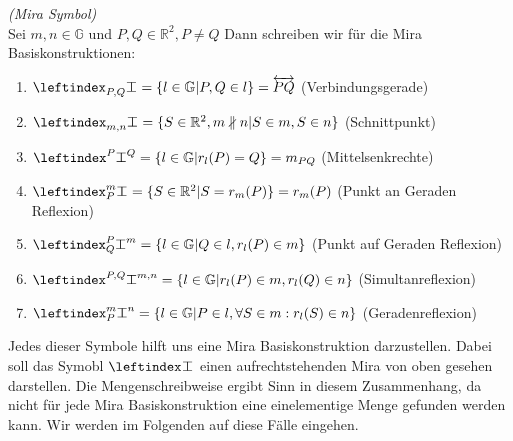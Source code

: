 \begin{notation}
    \textit{(Mira Symbol)}\\
    \label{not:mira}
    Sei $m,n \in \mathbb{G}$ und $P,Q \in \mathbb{R}^2, P \neq Q$
    Dann schreiben wir für die Mira Basiskonstruktionen:
    \begin{enumerate}[label=\textup{(}\roman*.\textup{)}]
        \item \label{itm:Verbindungsgerade} 
        $ \mira{P,Q}{}{} = \{l \in \mathbb{G} | P,Q \in l\} = \overleftrightarrow{PQ} $ \hfill 
        \textup{(}Verbindungsgerade\textup{)}
        \item \label{itm:Schnittpunkt}
        $ \mira{m,n}{}{} = \{S \in \mathbb{R}^2, m \nparallel n | S \in m, S \in n\} $ \hfill 
        \textup{(}Schnittpunkt\textup{)}
        \item \label{itm:Mittelsenkrechte}
        $ \mira{}{P}{Q} = \{l \in \mathbb{G} |  r_l(P) = Q\} = m_{PQ} $ \hfill 
        \textup{(}Mittelsenkrechte\textup{)}
        \item \label{itm:PunktAnGeradenReflexion}
        $ \mira{P}{m}{} = \{S \in \mathbb{R}^2 | S = r_m(P)\} = r_m(P) $ \hfill 
        \textup{(}Punkt an Geraden Reflexion\textup{)}
        \item \label{itm:PunktAufGeradenReflexion}
        $ \mira{Q}{P}{m} = \{l \in \mathbb{G} |  Q \in l, r_l(P) \in m\} $ \hfill
        \textup{(}Punkt auf Geraden Reflexion\textup{)}
        \item \label{itm:SimultanReflexion}
        $ \mira{}{P,Q}{m,n} = \{l \in \mathbb{G} |  r_l(P) \in m, r_l(Q) \in n\} $ \hfill
        \textup{(}Simultanreflexion\textup{)}
        \item \label{itm:GeradenReflexion}
        $ \mira{P}{m}{n} = \{l \in \mathbb{G} |  P \in l, \forall S \in m: r_l(S) \in n\} $ \hfill
        \textup{(}Geradenreflexion\textup{)}
    \end{enumerate}
\end{notation}

\begin{note}
    Jedes dieser Symbole hilft uns eine Mira Basiskonstruktion darzustellen. Dabei soll das Symobl $ \mira{}{}{}$ einen aufrechtstehenden Mira von oben gesehen darstellen.
    Die Mengenschreibweise ergibt Sinn in diesem Zusammenhang, da nicht für jede Mira Basiskonstruktion eine einelementige Menge gefunden werden kann. Wir werden im Folgenden auf diese Fälle eingehen.
\end{note}

